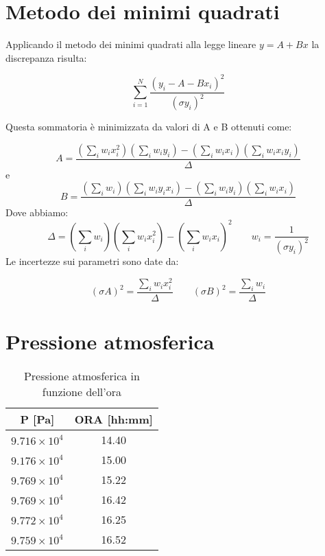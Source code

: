 \begin{appendices}

\section{Metodo dei minimi quadrati}
Applicando il metodo dei minimi quadrati alla legge lineare $y = A + Bx$ la discrepanza risulta:

\begin{equation}
\displaystyle\sum_{i=1}^{N}\frac{(y_i -A-Bx_i)^2}{(\sigma y_i)^2}
\end{equation}
\hspace{-1.8em}

Questa sommatoria è minimizzata da valori di A e B ottenuti come:

\begin{equation}
\label{eq:a}
A = \frac{(\sum_i w_i x_i^2)(\sum_i w_i y_i)-(\sum_i w_i x_i)(\sum_i w_i x_i y_i)}{\Delta} 
\end{equation}
e
\begin{equation}
\label{eq:b}
B = \frac{(\sum_i w_i)(\sum_i w_i y_i x_i)-(\sum_i w_i y_i)(\sum_i w_i x_i)}{\Delta}
\end{equation}
Dove abbiamo:
\[ \Delta = (\sum_i w_i)(\sum_i w_i x_i^2)-(\sum_i w_i x_i)^2  \quad \quad  w_i = \frac{1}{(\sigma y_i)^2}\]
\hspace{-1.8em}
Le incertezze sui parametri sono date da:

\begin{equation} 
\label{eq:sasb}
(\sigma A)^2 = \frac{\sum_i w_i x_i^2}{\Delta}\quad \quad (\sigma B)^2 = \frac{\sum_i w_i}{\Delta}
\end{equation}

\section{Pressione atmosferica}

\begin{table}[H]
	\centering
	\begin{tabular}{|c|c|} \hline
		\textbf{P {[Pa]} } & \textbf{ORA {[hh:mm]} }  \\ \hline
		$9.716\times 10^4$ & 14.40  \\ \hline
		$9.176\times 10^4$ & 15.00  \\ \hline
		$9.769\times 10^4$ & 15.22  \\ \hline
		$9.769\times 10^4$ & 16.42  \\ \hline
		$9.772\times 10^4$ & 16.25  \\ \hline
		$9.759\times 10^4$ & 16.52  \\ \hline
	\end{tabular}
	\caption{Pressione atmosferica in funzione dell'ora}
\end{table}


\end{appendices}
